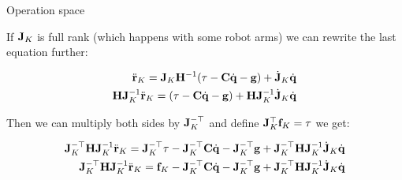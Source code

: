 \documentclass{beamer}
\begin{document}
\begin{frame}{Operation space}
	\begin{flushleft}
		
		If $\mathbf{J}_K$ is full rank (which happens with some robot arms) we can rewrite the last equation further:
		
		\begin{align}
			\ddot{\mathbf{r}}_K = \mathbf{J}_K \mathbf{H}^{-1} (\tau - \mathbf{C} \dot{\mathbf{q}} - \mathbf{g}) + \dot{\mathbf{J}}_K \dot{\mathbf{q}} 
			\\
			\mathbf{H}\mathbf{J}_K^{-1} \ddot{\mathbf{r}}_K =  (\tau - \mathbf{C} \dot{\mathbf{q}} - \mathbf{g}) + \mathbf{H}\mathbf{J}_K^{-1} \dot{\mathbf{J}}_K \dot{\mathbf{q}} 
		\end{align}
		
		Then we can multiply both sides by $ \mathbf{J}_K^{-\top}$ and define $\mathbf{J}_K^\top \mathbf{f}_K = \tau $ we get:
		
		\begin{align}
	\mathbf{J}_K^{-\top}\mathbf{H}\mathbf{J}_K^{-1} \ddot{\mathbf{r}}_K
	 =  
	 \mathbf{J}_K^{-\top}\tau - \mathbf{J}_K^{-\top} \mathbf{C} \dot{\mathbf{q}} - \mathbf{J}_K^{-\top}\mathbf{g} + \mathbf{J}_K^{-\top} \mathbf{H}\mathbf{J}_K^{-1} \dot{\mathbf{J}}_K \dot{\mathbf{q}}
	  \\
	\mathbf{J}_K^{-\top}\mathbf{H}\mathbf{J}_K^{-1} \ddot{\mathbf{r}}_K
=  
\mathbf{f}_K - \mathbf{J}_K^{-\top} \mathbf{C} \dot{\mathbf{q}} - \mathbf{J}_K^{-\top}\mathbf{g} + \mathbf{J}_K^{-\top} \mathbf{H}\mathbf{J}_K^{-1} \dot{\mathbf{J}}_K \dot{\mathbf{q}}	  
		\end{align}
		
	\end{flushleft}
\end{frame}
\end{document}
